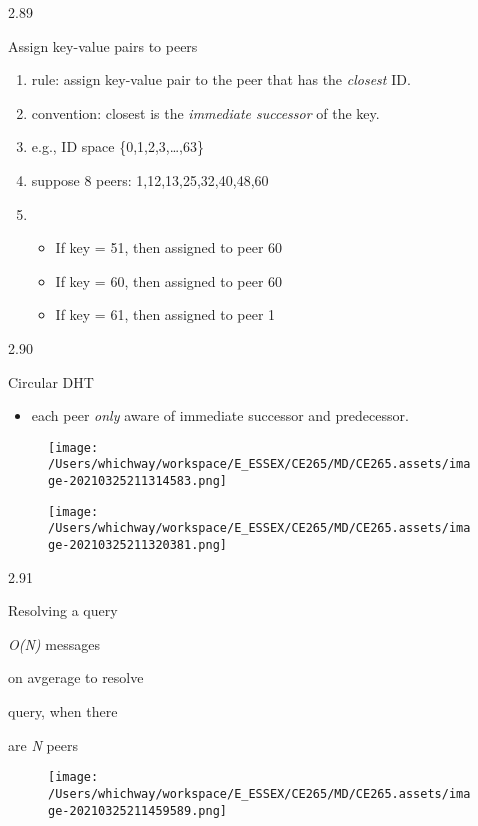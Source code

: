 \documentclass[
]{article}
\begin{document}
2.89

Assign key-value pairs to peers

\begin{enumerate}
\def\labelenumi{\arabic{enumi}.}
\item
  rule: assign key-value pair to the peer that has the \emph{closest}
  ID.
\item
  convention: closest is the \emph{immediate successor} of the key.
\item
  e.g., ID space \{0,1,2,3,\ldots,63\}
\item
  suppose 8 peers: 1,12,13,25,32,40,48,60
\item
  \begin{itemize}
  \item
    If key = 51, then assigned to peer 60
  \item
    If key = 60, then assigned to peer 60
  \item
    If key = 61, then assigned to peer 1
  \end{itemize}
\end{enumerate}

2.90

Circular DHT

\begin{itemize}
\item
  each peer \emph{only} aware of immediate successor and predecessor.
\end{itemize}

\begin{figure}
\centering
\texttt{[image: /Users/whichway/workspace/E\_ESSEX/CE265/MD/CE265.assets/image-20210325211314583.png]}
\caption{}
\end{figure}

\begin{figure}
\centering
\texttt{[image: /Users/whichway/workspace/E\_ESSEX/CE265/MD/CE265.assets/image-20210325211320381.png]}
\caption{}
\end{figure}

2.91

Resolving a query

\emph{O(N)} messages

on avgerage to resolve

query, when there

are \emph{N} peers

\begin{figure}
\centering
\texttt{[image: /Users/whichway/workspace/E\_ESSEX/CE265/MD/CE265.assets/image-20210325211459589.png]}
\caption{}
\end{figure}
\end{document}

